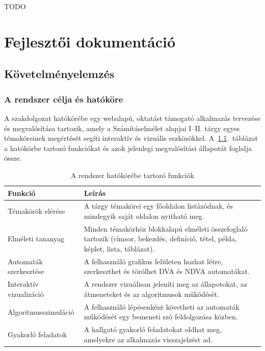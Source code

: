 \documentclass[12pt,a4paper]{report}
\begin{document}
TODO

\chapter{Fejlesztői dokumentáció}

\section{Követelményelemzés}

\subsection{A rendszer célja és hatóköre}

A szakdolgozat hatókörébe egy webalapú, oktatást támogató alkalmazás
tervezése és megvalósítása tartozik, amely a Számításelmélet
alapjai I--II. tárgy egyes témaköreinek megértését segíti interaktív
és vizuális eszközökkel. A~\ref{tab:in_scope}.~táblázat a hatókörbe
tartozó funkciókat és azok jelenlegi megvalósítási állapotát
foglalja össze.

\begin{table}[htbp]
    \centering
    \begin{tabularx}{\textwidth}{l X l}
        \toprule
        \textbf{Funkció} & \textbf{Leírás} \\
        \midrule
        Témakörök elérése &
        A tárgy témakörei egy főoldalon listázódnak, és mindegyik
        saját oldalon nyitható meg. \\
        Elméleti tananyag &
        Minden témakörhöz blokkalapú elméleti összefoglaló tartozik
        (címsor, bekezdés, definíció, tétel, példa, képlet, lista,
        táblázat). \\
        Automaták szerkesztése &
        A felhasználó grafikus felületen hozhat létre, szerkeszthet és
        törölhet DVA és NDVA automatákat. \\
        Interaktív vizualizáció &
        A rendszer vizuálisan jeleníti meg az állapotokat, az
        átmeneteket és az algoritmusok működését.  \\
        Algoritmusszimuláció &
        A felhasználó lépésenként követheti az automaták működését egy
        bemeneti szó feldolgozása közben.  \\
        Gyakorló feladatok &
        A hallgató gyakorló feladatokat oldhat meg, amelyekre az
        alkalmazás visszajelzést ad.  \\
        \bottomrule
    \end{tabularx}
    \caption{A rendszer hatókörébe tartozó funkciók}
    \label{tab:in_scope}
\end{table}
\end{document}

